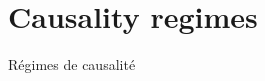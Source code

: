 





\newpage


\section{Causality regimes}{Régimes de causalité}

\label{app:sec:causalityregimes}










